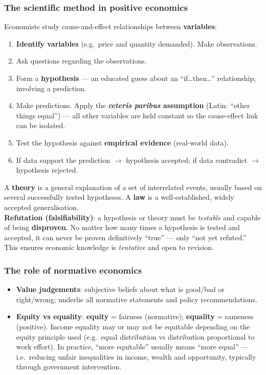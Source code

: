 \subsubsection*{The scientific method in positive economics}
Economists study cause-and-effect relationships between \textbf{variables}:
\begin{enumerate}
  \item \textbf{Identify variables} (e.g.\ price and quantity demanded). Make observations.
  \item Ask questions regarding the observations. 
  \item Form a \textbf{hypothesis} --- an educated guess about an ``if\dots then\dots'' relationship, involving a prediction.
  \item Make predictions. Apply the \textbf{\textit{\emph{ceteris paribus}} assumption} (Latin: ``other things equal'') --- all other variables are held constant so the cause-effect link can be isolated.
  \item Test the hypothesis against \textbf{empirical evidence} (real-world data).
  \item If data support the prediction $\to$ hypothesis accepted; if data contradict $\to$ hypothesis rejected.
\end{enumerate}
A \textbf{theory} is a general explanation of a set of interrelated events, usually based on several successfully tested hypotheses. A \textbf{law} is a well-established, widely accepted generalisation.\\
\textbf{Refutation (falsifiability)}: a hypothesis or theory must be \textit{testable} and capable of being \textbf{disproven}. No matter how many times a hypothesis is tested and accepted, it can never be proven definitively ``true'' --- only ``not yet refuted.'' This ensures economic knowledge is \textit{tentative} and open to revision.
\subsubsection*{The role of normative economics}
\begin{itemize}
  \item \textbf{Value judgements}: subjective beliefs about what is good/bad or right/wrong; underlie all normative statements and policy recommendations.
  \item \textbf{Equity vs equality}: \textbf{equity} = fairness (normative); \textbf{equality} = sameness (positive). Income equality may or may not be equitable depending on the equity principle used (e.g.\ equal distribution vs distribution proportional to work effort). In practice, ``more equitable'' usually means ``more equal'' --- i.e.\ reducing unfair inequalities in income, wealth and opportunity, typically through government intervention.
\end{itemize}
